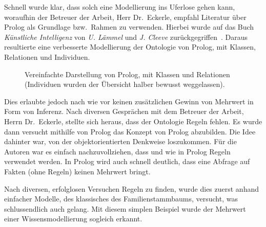 Schnell wurde klar, dass solch eine Modellierung ins Uferlose gehen kann, woraufhin der Betreuer der Arbeit, Herr Dr.\ Eckerle, empfahl Literatur über Prolog als Grundlage bzw.\ Rahmen zu verwenden. Hierbei wurde auf das Buch \textit{Künstliche Intelligenz} von \textit{U. Lämmel} und \textit{J. Cleeve} zurückgegriffen~\cite{laemmel}. Daraus resultierte eine verbesserte Modellierung der Ontologie von Prolog, mit Klassen, Relationen und Individuen.

\begin{figure}[H]
\centering {}
\caption{Vereinfachte Darstellung von Prolog, mit Klassen und Relationen (Individuen wurden der Übersicht halber bewusst weggelassen).\label{fig:prolog_baum}\protect\footnotemark}
\end{figure}

Dies erlaubte jedoch nach wie vor keinen zusätzlichen Gewinn von Mehrwert in Form von Inferenz. Nach diversen Gesprächen mit dem Betreuer der Arbeit, Herrn Dr.\ Eckerle, stellte sich heraus, dass der Ontologie Regeln fehlen. Es wurde dann versucht mithilfe von Prolog das Konzept von Prolog abzubilden. Die Idee dahinter war, von der objektorientierten Denkweise loszukommen. Für die Autoren war es einfach nachzuvollziehen, dass und wie in Prolog Regeln verwendet werden. In Prolog wird auch schnell deutlich, dass eine Abfrage auf Fakten (ohne Regeln) keinen Mehrwert bringt.

Nach diversen, erfolglosen Versuchen Regeln zu finden, wurde dies zuerst anhand einfacher Modelle, des klassisches des Familienstammbaums, versucht, was schlussendlich auch gelang. Mit diesem simplen Beispiel wurde der Mehrwert einer Wissensmodellierung sogleich erkannt.

